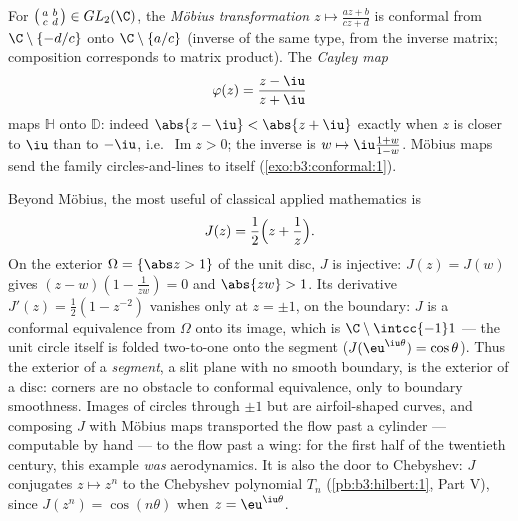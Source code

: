 \begin{example}
\label{ex:b3:conformal:mobius}
For $\bigl(\begin{smallmatrix}a & b\\ c &
d\end{smallmatrix}\bigr) \in GL_2(\C)$, the \emph{M\"obius
transformation} $z \mapsto
\frac{az + b}{cz + d}$ is conformal from
$\C\setminus\{-d/c\}$ onto $\C\setminus\{a/c\}$ (inverse of
the same type, from the inverse matrix; composition
corresponds to matrix product). The \emph{Cayley
map}
\[
\varphi(z) = \frac{z - \iu}{z + \iu}
\]
maps $\mathbb H$  onto $\mathbb D$: indeed $\abs{z
- \iu} < \abs{z + \iu}$ exactly when $z$ is closer to $\iu$
than to $-\iu$, i.e.\ $\operatorname{Im}z > 0$; the inverse is
$w \mapsto \iu\frac{1 + w}{1 - w}$. M\"obius maps send the
family circles-and-lines to itself (\cref{exo:b3:conformal:1}).
\end{example}

\begin{example}\label{ex:b3:conformal:joukowski}
Beyond M\"obius, the most useful  of classical
applied mathematics is
\[
J(z) = \frac12\Bigl(z + \frac1z\Bigr) .
\]
On the exterior $\Omega = \{\abs z > 1\}$ of the unit disc,
$J$ is injective: $J(z) = J(w)$ gives $(z - w)(1 -
\frac1{zw}) = 0$ and $\abs{zw} > 1$. Its derivative $J'(z) =
\frac12(1 - z^{-2})$ vanishes only at $z = \pm1$, on the
boundary: $J$ is a conformal equivalence from $\Omega$ onto
its image, which is $\C\setminus\intcc{-1}1$ --- the unit
circle itself is folded two-to-one onto the segment
($J(\eu^{\iu\theta}) = \cos\theta$). Thus the exterior of a
\emph{segment}, a slit plane with no smooth boundary, is
 the exterior of a disc: corners are no obstacle
to conformal equivalence, only to boundary smoothness. Images
of circles through $\pm1$ but  are airfoil-shaped
curves, and composing $J$ with M\"obius maps transported the
flow past a cylinder --- computable by hand --- to the flow
past a wing: for the first half of the twentieth century,
this example \emph{was} aerodynamics. It is also the door to
Chebyshev: $J$ conjugates $z \mapsto z^n$ to the Chebyshev
polynomial $T_n$ (\cref{pb:b3:hilbert:1}, Part V), since
$J(z^n) = \cos(n\theta)$ when $z = \eu^{\iu\theta}$.
\end{example}

